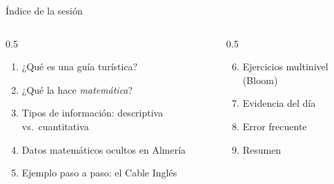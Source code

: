\documentclass[aspectratio=169, 10pt, spanish]{beamer}
\begin{document}
\begin{frame}[plain]
  \titlepage
\end{frame}

\begin{frame}{Índice de la sesión}
  \begin{columns}[t]
    \begin{column}{0.5\textwidth}
      \begin{enumerate}
        \item ¿Qué es una guía turística?
        \item ¿Qué la hace \textit{matemática}?
        \item Tipos de información: descriptiva vs.\ cuantitativa
        \item Datos matemáticos ocultos en Almería
        \item Ejemplo paso a paso: el Cable Inglés
      \end{enumerate}
    \end{column}
    \begin{column}{0.5\textwidth}
      \begin{enumerate}
        \setcounter{enumi}{5}
        \item Ejercicios multinivel (Bloom)
        \item Evidencia del día
        \item Error frecuente
        \item Resumen
      \end{enumerate}
    \end{column}
  \end{columns}
\end{frame}

\end{document}
